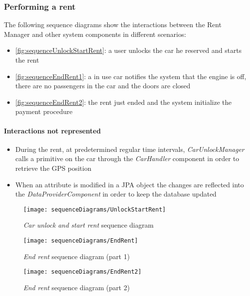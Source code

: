 \clearpage
\subsubsection{Performing a rent}
The following sequence diagrams show the interactions between the \mbox{Rent} \mbox{Manager} and other system components in different scenarios:
\begin{itemize}
	\item \autoref{fig:sequenceUnlockStartRent}: a user unlocks the car he reserved and starts the rent
	\item \autoref{fig:sequenceEndRent1}: a in use car notifies the system that the engine is off, there are no passengers in the car and the doors are closed
	\item \autoref{fig:sequenceEndRent2}: the rent just ended and the system initialize the payment procedure
\end{itemize}

\paragraph{Interactions not represented}
\begin{itemize}
	\item During the rent, at predetermined regular time intervals, \emph{CarUnlockManager} calls a primitive on the car through the \emph{CarHandler} component in order to retrieve the GPS position

	\item When an attribute is modified in a JPA object the changes are reflected into the \emph{DataProviderComponent} in order to keep the database updated
\end{itemize}
\clearpage

\begin{figure}[h!]
	\centering
	\texttt{[image: sequenceDiagrams/UnlockStartRent]}
	\caption{
		\label{fig:sequenceUnlockStartRent} 
		\emph{Car unlock and start rent} sequence diagram
	}
\end{figure}
\begin{figure}[h!]
	\centering
	\texttt{[image: sequenceDiagrams/EndRent]}
	\caption{
		\label{fig:sequenceEndRent1} 
		\emph{End rent} sequence diagram (part 1)
	}
\end{figure}
\begin{figure}[h!]
	\centering
	\texttt{[image: sequenceDiagrams/EndRent2]}
	\caption{
		\label{fig:sequenceEndRent2} 
		\emph{End rent} sequence diagram (part 2)
	}
\end{figure}

